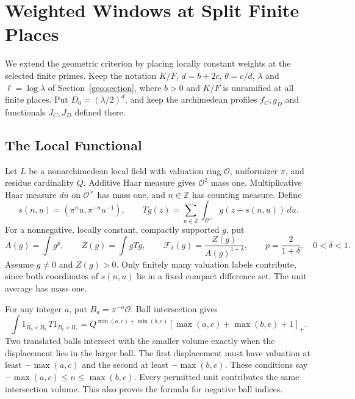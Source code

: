 \section{Weighted Windows at Split Finite Places}
\label{fw:section}

We extend the geometric criterion by placing locally constant weights
at the selected finite primes. Keep the notation $K/F$, $d=b+2c$,
$\theta=c/d$, $\lambda$ and $\ell=\log\lambda$ of
Section~\ref{geo:section}, where $b>0$ and $K/F$ is unramified at all
finite places. Put $D_0=(\lambda/2)^d$, and keep the archimedean profiles
$f_C,g_D$ and functionals $J_C,J_D$ defined there.

\subsection{The Local Functional}

Let $L$ be a nonarchimedean local field with valuation ring $\mathcal O$,
uniformizer $\pi$, and residue cardinality $Q$. Additive Haar measure gives
$\mathcal O^2$ mass one. Multiplicative Haar measure $du$ on
$\mathcal O^\times$ has mass one, and $n\in\mathbb Z$ has counting measure.
Define
\[
 s(n,u)=(\pi^nu,\pi^{-n}u^{-1}),\qquad
 Tg(z)=\sum_{n\in\mathbb Z}\int_{\mathcal O^\times}g(z+s(n,u))\,du.
\]
For a nonnegative, locally constant, compactly supported $g$, put
\begin{equation}\label{fw:functional}
 A(g)=\int g^p,\qquad Z(g)=\int gTg,\qquad
 \mathcal F_\delta(g)=\frac{Z(g)}{A(g)^{1+\delta}},
 \qquad p=\frac2{1+\delta},\quad0<\delta<1.
\end{equation}
Assume $g\ne0$ and $Z(g)>0$. Only finitely many valuation labels
contribute, since both coordinates of $s(n,u)$ lie in a fixed compact
difference set. The unit average has mass one.

For any integer $a$, put $B_a=\pi^{-a}\mathcal O$. Ball intersection gives
\begin{equation}\label{fw:rectangle-gram}
 \int 1_{B_a\times B_b}\,T1_{B_c\times B_e}
 =Q^{\min(a,c)+\min(b,e)}
   [\max(a,c)+\max(b,e)+1]_+.
\end{equation}
Two translated balls intersect with the smaller volume exactly when
the displacement lies in the larger ball. The first displacement must
have valuation at least $-\max(a,c)$ and the second at least
$-\max(b,e)$. These conditions say
$-\max(a,c)\le n\le\max(b,e)$. Every permitted unit contributes the same
intersection volume. This also proves the formula for negative ball indices.

